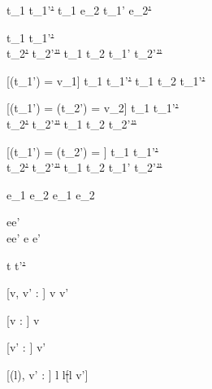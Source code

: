   {t_1\st{} \normalise t_1'\st{'}}
  {t_1 \Next e_2\st{} \normalise t_1' \Next e_2\st{'}}


  {t_1\st{}  \normalise t_1'\st{'} \\
   t_2\st{'} \normalise t_2'\st{''}}
  {t_1 \And t_2\st{} \normalise t_1' \And t_2'\st{''}}


[\Value(t_1') = v_1]
  {t_1\st{}  \normalise t_1'\st{'}}
  {t_1 \Or t_2\st{} \normalise t_1'\st{'}}

[\Value(t_1') = \bot \land \Value(t_2') = v_2]
  {t_1\st{}  \normalise t_1'\st{'} \\
   t_2\st{'} \normalise t_2'\st{''}}
  {t_1 \Or t_2\st{} \normalise t_2'\st{''}}

[\Value(t_1') = \bot \land \Value(t_2') = \bot]
  {t_1\st{}  \normalise t_1'\st{'} \\
   t_2\st{'} \normalise t_2'\st{''}}
  {t_1 \Or t_2\st{} \normalise t_1' \Or t_2'\st{''}}


  { }
  {e_1 \Xor e_2\st{} \normalise e_1 \Xor e_2\st{}}

    {e\evaluate e' \\
    e\neq e'}
    {e \normalise e'}








  {t\st{}  t'\st{'}}


[v, v' : \beta]
  { }
  {\Edit v\st{}  \Edit v'\st{}}

[v : \beta]
  { }
  {\Edit v\st{} \handle{\Empty} \Enter \beta\st{}}

[v' : \beta]
  { }
  {\Enter \beta\st{}  \Edit v'\st{}}

[\Sigma(l), v' : \beta]
  { }
  {\Update l\st{}  \Update l\st[l \mapsto v']{}}


  { }
  {\Fail\st{}  \Fail\st{}}


